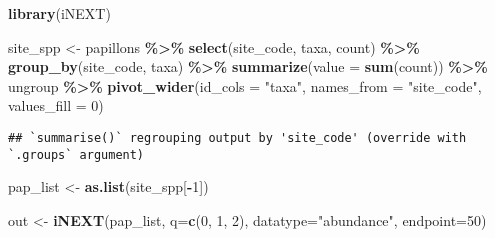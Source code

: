\documentclass[
]{book}
\newenvironment{Shaded}{\begin{snugshade}}{\end{snugshade}}
\newcommand{\DataTypeTok}[1]{\textcolor[rgb]{0.13,0.29,0.53}{#1}}
\newcommand{\DecValTok}[1]{\textcolor[rgb]{0.00,0.00,0.81}{#1}}
\newcommand{\KeywordTok}[1]{\textcolor[rgb]{0.13,0.29,0.53}{\textbf{#1}}}
\newcommand{\NormalTok}[1]{#1}
\newcommand{\OperatorTok}[1]{\textcolor[rgb]{0.81,0.36,0.00}{\textbf{#1}}}
\newcommand{\StringTok}[1]{\textcolor[rgb]{0.31,0.60,0.02}{#1}}
\begin{document}
\begin{Shaded}
\begin{Highlighting}[]
\KeywordTok{library}\NormalTok{(iNEXT)}
\end{Highlighting}
\end{Shaded}

\begin{Shaded}
\begin{Highlighting}[]
\NormalTok{site\_spp \textless{}{-}}\StringTok{ }\NormalTok{papillons }\OperatorTok{\%\textgreater{}\%}\StringTok{ }
\StringTok{  }\KeywordTok{select}\NormalTok{(site\_code, taxa, count) }\OperatorTok{\%\textgreater{}\%}\StringTok{ }
\StringTok{  }\KeywordTok{group\_by}\NormalTok{(site\_code, taxa) }\OperatorTok{\%\textgreater{}\%}\StringTok{ }
\StringTok{  }\KeywordTok{summarize}\NormalTok{(}\DataTypeTok{value =} \KeywordTok{sum}\NormalTok{(count)) }\OperatorTok{\%\textgreater{}\%}\StringTok{ }\NormalTok{ungroup }\OperatorTok{\%\textgreater{}\%}\StringTok{ }
\StringTok{  }\KeywordTok{pivot\_wider}\NormalTok{(}\DataTypeTok{id\_cols =} \StringTok{"taxa"}\NormalTok{, }\DataTypeTok{names\_from =} \StringTok{"site\_code"}\NormalTok{, }\DataTypeTok{values\_fill =} \DecValTok{0}\NormalTok{)}
\end{Highlighting}
\end{Shaded}

\begin{verbatim}
## `summarise()` regrouping output by 'site_code' (override with `.groups` argument)
\end{verbatim}

\begin{Shaded}
\begin{Highlighting}[]
\NormalTok{pap\_list \textless{}{-}}\StringTok{ }\KeywordTok{as.list}\NormalTok{(site\_spp[}\OperatorTok{{-}}\DecValTok{1}\NormalTok{])}
\end{Highlighting}
\end{Shaded}

\begin{Shaded}
\begin{Highlighting}[]
\NormalTok{out \textless{}{-}}\StringTok{ }\KeywordTok{iNEXT}\NormalTok{(pap\_list, }\DataTypeTok{q=}\KeywordTok{c}\NormalTok{(}\DecValTok{0}\NormalTok{, }\DecValTok{1}\NormalTok{, }\DecValTok{2}\NormalTok{), }\DataTypeTok{datatype=}\StringTok{"abundance"}\NormalTok{, }\DataTypeTok{endpoint=}\DecValTok{50}\NormalTok{)}
\end{Highlighting}
\end{Shaded}
\end{document}
